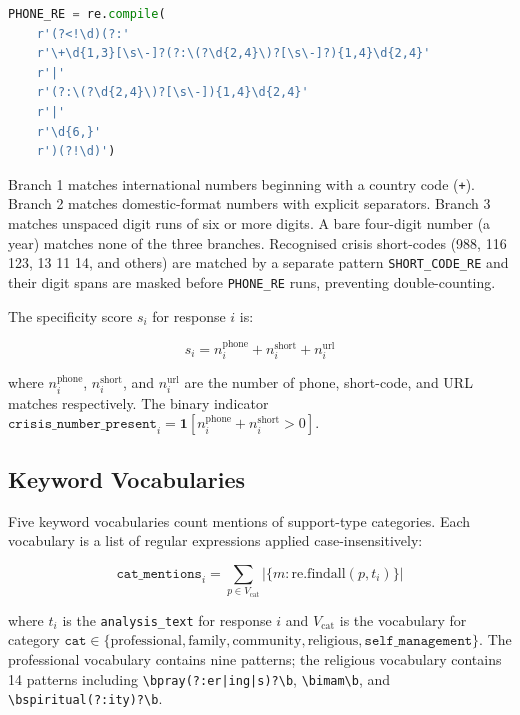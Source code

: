 \begin{lstlisting}[language=Python]
PHONE_RE = re.compile(
    r'(?<!\d)(?:'
    r'\+\d{1,3}[\s\-]?(?:\(?\d{2,4}\)?[\s\-]?){1,4}\d{2,4}'
    r'|'
    r'(?:\(?\d{2,4}\)?[\s\-]){1,4}\d{2,4}'
    r'|'
    r'\d{6,}'
    r')(?!\d)')
\end{lstlisting}

Branch 1 matches international numbers beginning with a country code (\texttt{+}). Branch 2 matches domestic-format numbers with explicit separators. Branch 3 matches unspaced digit runs of six or more digits. A bare four-digit number (a year) matches none of the three branches. Recognised crisis short-codes (988, 116 123, 13 11 14, and others) are matched by a separate pattern \texttt{SHORT\_CODE\_RE} and their digit spans are masked before \texttt{PHONE\_RE} runs, preventing double-counting.

The specificity score $s_i$ for response $i$ is:

\begin{equation}
s_i = n^{\text{phone}}_i + n^{\text{short}}_i + n^{\text{url}}_i
\label{eq:specificity}
\end{equation}

where $n^{\text{phone}}_i$, $n^{\text{short}}_i$, and $n^{\text{url}}_i$ are the number of phone, short-code, and URL matches respectively. The binary indicator $\texttt{crisis\_number\_present}_i = \mathbf{1}[n^{\text{phone}}_i + n^{\text{short}}_i > 0]$.

\subsection{Keyword Vocabularies}

Five keyword vocabularies count mentions of support-type categories. Each vocabulary is a list of regular expressions applied case-insensitively:

\begin{equation}
\texttt{cat\_mentions}_i = \sum_{p \in V_{\text{cat}}} \lvert\{m : \text{re.findall}(p, t_i)\}\rvert
\label{eq:keyword_count}
\end{equation}

where $t_i$ is the \texttt{analysis\_text} for response $i$ and $V_{\text{cat}}$ is the vocabulary for category $\texttt{cat} \in \{\text{professional}, \text{family}, \text{community}, \text{religious}, \texttt{self\_management}\}$. The professional vocabulary contains nine patterns; the religious vocabulary contains 14 patterns including \texttt{{\textbackslash}bpray(?:er|ing|s)?{\textbackslash}b}, \texttt{{\textbackslash}bimam{\textbackslash}b}, and \texttt{{\textbackslash}bspiritual(?:ity)?{\textbackslash}b}.


